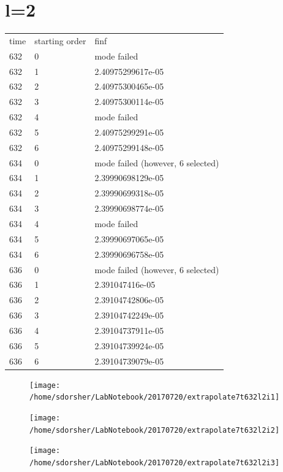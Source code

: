 \section{l=2}
\begin{table}
  \begin{tabular}{lll}
    time & starting order & finf\\
    632 & 0 & mode failed\\
    632 & 1 & 2.40975299617e-05\\
    632 & 2 & 2.40975300465e-05\\
    632 & 3 & 2.40975300114e-05\\
    632 & 4 & mode failed\\
    632 & 5 & 2.40975299291e-05\\
    632 & 6 & 2.40975299148e-05\\
    \hline
    634 & 0 & mode failed (however, 6 selected)\\
    634 & 1 & 2.39990698129e-05\\
    634 & 2 & 2.39990699318e-05\\
    634 & 3 & 2.39990698774e-05\\
    634 & 4 & mode failed\\
    634 & 5 & 2.39990697065e-05\\
    634 & 6 & 2.39990696758e-05\\
    \hline
    636 & 0 & mode failed (however, 6 selected)\\
    636 & 1 & 2.391047416e-05\\
    636 & 2 & 2.39104742806e-05\\
    636 & 3 & 2.39104742249e-05\\
    636 & 4 & 2.39104737911e-05\\
    636 & 5 & 2.39104739924e-05\\
    636 & 6 & 2.39104739079e-05\\
  \end{tabular}
\end{table}

\begin{figure}
  \texttt{[image: /home/sdorsher/LabNotebook/20170720/extrapolate7t632l2i1]}
\end{figure}

\begin{figure}
  \texttt{[image: /home/sdorsher/LabNotebook/20170720/extrapolate7t632l2i2]}
\end{figure}

\begin{figure}
  \texttt{[image: /home/sdorsher/LabNotebook/20170720/extrapolate7t632l2i3]}
\end{figure}

